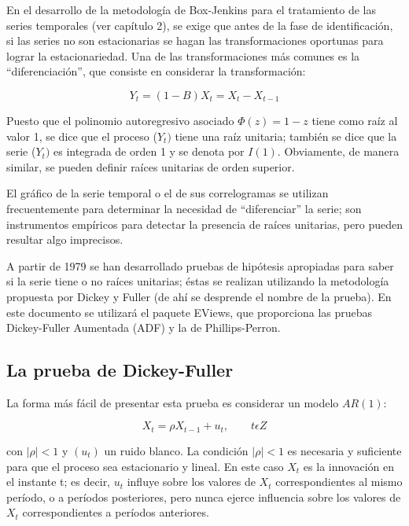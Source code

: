 En el desarrollo de la metodolog\'{i}a de Box-Jenkins para el tratamiento de las series temporales (ver cap\'{i}tulo 2), se exige que antes de la fase de identificaci\'{o}n, si las series no son estacionarias se hagan las transformaciones oportunas para lograr la estacionariedad. Una de las transformaciones m\'{a}s comunes es la ``diferenciaci\'{o}n'', que consiste en considerar la transformaci\'{o}n:

\[
Y_{t}=\left( 1-B \right)X_{t}=X_{t}-X_{t-1}
\]

Puesto que el polinomio autoregresivo asociado ${\Phi }\left( z \right)=1-z$ tiene como ra\'{i}z al valor 1, se dice que el proceso ($Y_{t})$ tiene una ra\'{i}z unitaria; tambi\'{e}n se dice que la serie ($Y_{t})$ es integrada de orden 1 y se denota por $I(1)$. Obviamente, de manera similar, se pueden definir ra\'{i}ces unitarias de orden superior.\newline

El gr\'{a}fico de la serie temporal o el de sus correlogramas se utilizan frecuentemente para determinar la necesidad de ``diferenciar'' la serie; son instrumentos emp\'{i}ricos para detectar la presencia de ra\'{i}ces unitarias, pero pueden resultar algo imprecisos.\newline

A partir de 1979 se han desarrollado pruebas de hip\'{o}tesis apropiadas para saber si la serie tiene o no ra\'{i}ces unitarias; \'{e}stas se realizan utilizando la metodolog\'{i}a propuesta por Dickey y Fuller (de ah\'{i} se desprende el nombre de la prueba). En este documento se utilizar\'{a} el paquete EViews, que proporciona las pruebas Dickey-Fuller Aumentada (ADF) y la de Phillips-Perron.

\subsection{La prueba de Dickey-Fuller}

La forma m\'{a}s f\'{a}cil de presentar esta prueba es considerar un modelo $AR(1)$:

\[
X_{t}=\rho X_{t-1}+u_{t},\qquad        
t  \epsilon   Z
\]

con $\left| \rho \right|<1$ y $(u_{t})$ un ruido blanco. La condici\'{o}n $\left| \rho \right|<1$ es necesaria y suficiente para que el proceso sea estacionario y lineal. En este caso $X_{t}$ es la innovaci\'{o}n en el instante t; es decir, $u_{t}$ influye sobre los valores de $X_{t}$ correspondientes al mismo per\'{i}odo, o a per\'{i}odos posteriores, pero nunca ejerce influencia sobre los valores de $X_{t}$ correspondientes a per\'{i}odos anteriores.\newline

